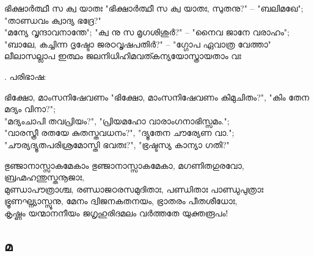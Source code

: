 \begin{enumerate}



\begin{slokam}{\VSr}{\Unk}{ഭിക്ഷാർത്ഥീ സ ക്വ യാതഃ}
"ഭിക്ഷാർത്ഥീ സ ക്വ യാതഃ, സുതനു?" -- "ബലിമഖേ"; "താണ്ഡവം ക്വാദ്യ ഭദ്രേ?"\\
"മന്യേ വൃന്ദാവനാന്തേ"; "ക്വ നു സ മൃഗശിശുർ?" -- "നൈവ ജാനേ വരാഹം";\\
"ബാലേ, കച്ചിന്ന ദൃഷ്ടോ ജരഠവൃഷപതിർ?" -- "ഗ്ഗോപ ഏവാത്ര വേത്താ"\\
ലീലാസല്ലാപ ഇത്ഥം ജലനിധിഹിമവത്കന്യയോസ്ത്രായതാം വഃ
\end{slokam}


.  പരിഭാഷ:  

\begin{slokam}{\VSv}{\KD}{ഭിക്ഷോ, മാംസനിഷേവണം}
 "ഭിക്ഷോ, മാംസനിഷേവണം കിമുചിതം?", "കിം തേന മദ്യം വിനാ?";\\
"മദ്യംചാപി തവപ്രിയം?", "പ്രിയമഹോ വാരാംഗനാഭിസ്സമം.";\\
"വാരസ്ത്രീ രതയേ കുതസ്തവധനം?", "ദ്യൂതേന ചൗര്യേണ വാ.";\\
"ചൗര്യദ്യൂതപരിശ്രമോസ്തി ഭവതഃ?", "ഭ്രഷ്ടസ്യ കാന്യാ ഗതി?"
\end{slokam}


\begin{slokam}{\VSr}{\Melp}{ഭുഞ്ജാനാസ്സാകമേകാം}
 ഭുഞ്ജാനാസ്സാകമേകാ, മഗണിതഗുരവോ, ബ്രഹ്മഹന്തുസ്തനൂജാഃ,\\
മുണ്ഡാപൗത്രാശ്ച, രണ്ഡാജഠരസമുദിതാഃ, പണ്ഡിതാഃ പാണ്ഡുപുത്രാഃ\\
ഭ്രൂണഘ്ന്യാസ്സൂനു, മേനം ദ്വിജനകതനയം, ഭ്രാതരം പീതശീധോഃ,\\
കൃഷ്ണം യന്മാനനീയം ജഗൃഹുരിദമലം വർത്തതേ യുക്തരൂപം!
\end{slokam}




\end{enumerate}

\subsection{മ}

